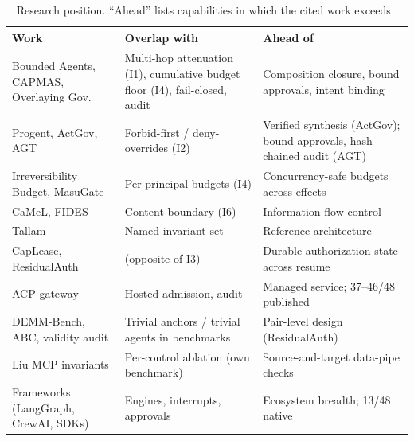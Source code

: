 \begin{table}[t]
\centering\small
\caption{Research position. ``Ahead'' lists capabilities in which the cited work exceeds \method{}.}
\label{tab:position}
\begin{tabularx}{\textwidth}{P{3.2cm}YY}
\toprule
Work & Overlap with \method{} & Ahead of \method{} \\
\midrule
Bounded Agents, CAPMAS, Overlaying Gov. & Multi-hop attenuation (I1), cumulative budget floor (I4), fail-closed, audit & Composition closure, bound approvals, intent binding \\
Progent, ActGov, AGT & Forbid-first / deny-overrides (I2) & Verified synthesis (ActGov); bound approvals, hash-chained audit (AGT) \\
Irreversibility Budget, MasuGate & Per-principal budgets (I4) & Concurrency-safe budgets across effects \\
CaMeL, FIDES & Content boundary (I6) & Information-flow control \\
Tallam & Named invariant set & Reference architecture \\
CapLease, ResidualAuth & (opposite of I3) & Durable authorization state across resume \\
ACP gateway & Hosted admission, audit & Managed service; 37--46/48 published \\
DEMM-Bench, ABC, validity audit & Trivial anchors / trivial agents in benchmarks & Pair-level design (ResidualAuth) \\
Liu MCP invariants & Per-control ablation (own benchmark) & Source-and-target data-pipe checks \\
Frameworks (LangGraph, CrewAI, SDKs) & Engines, interrupts, approvals & Ecosystem breadth; 13/48 native \\
\bottomrule
\end{tabularx}
\end{table}
